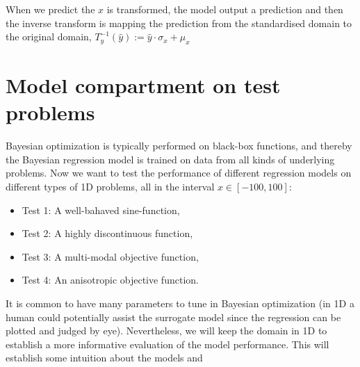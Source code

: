 When we predict the $x$ is transformed, the model output a prediction 
and then the inverse transform is mapping the prediction from the standardised
domain to the original domain, 
 $T^{-1}_y(\hat y) := \hat y \cdot \sigma_x+\mu_x$


\section{Model compartment on test problems}
Bayesian optimization is typically performed on black-box functions, and thereby the Bayesian
regression model is trained on data from all kinds of underlying problems. Now we want to test the
performance of different regression models on different types of 1D problems, all in the interval $x
\in [-100,100]$:

\begin{itemize}
  \item Test 1: A well-bahaved sine-function,
  \item Test 2: A highly discontinuous function,
  \item Test 3: A multi-modal objective function,
  \item Test 4: An anisotropic objective function.
\end{itemize}

It is common to have many parameters to tune in Bayesian optimization (in 1D a human could
potentially assist the surrogate model since the regression can be plotted and judged by eye).
Nevertheless, we will keep the domain in 1D to establish  
a more informative evaluation of the model performance.
This will establish some intuition about the models and 

